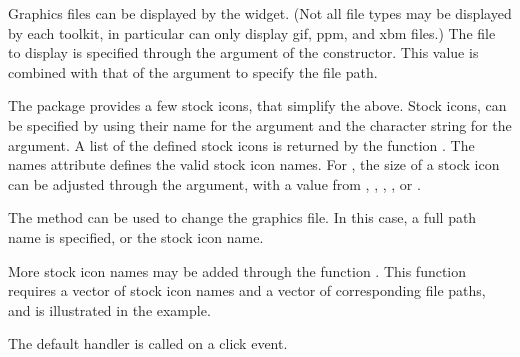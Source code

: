 Graphics files can be displayed by the 
widget. (Not all file types may be displayed by each toolkit, in
particular  can only display gif, ppm, and xbm
files.)  The file to display is specified through the
 argument of the constructor. This value is combined with that
of the  argument to specify the file
path. 

The  package provides a few stock icons, that simplify
the above.  Stock icons, can be specified by using their name for the
 argument and the character string  for
the  argument. A list of the defined stock icons is
returned by the function . The names attribute
defines the valid stock icon names.  For , the size
of a stock icon can be adjusted through the  argument,
with a value from , ,
, , or .


The  method can be used to change the
graphics file. In this case, a full path name is specified, or the
stock icon name.


More stock icon names may be added through the function
. This function requires a vector of stock icon
names and a vector of corresponding file paths, and is illustrated in
the example.

The default handler is called on a click event.

